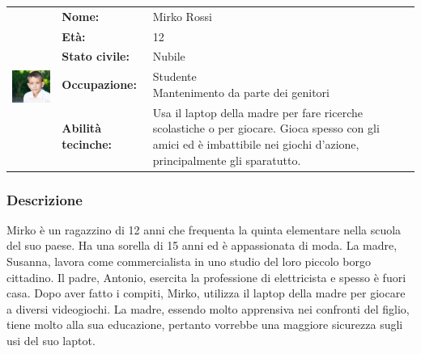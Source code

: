 \documentclass[../Report.tex]{subfiles}
\begin{document}
    \vspace{1.5cm}

    \begin{table}[H]
        \begin{tabular}{|c|l|p{7cm}|}
            \hline
            \multirow{5}{*}{\includegraphics[width=5cm, height=5cm]{Mirko.jpg}} 
                & \textbf{Nome:} & Mirko Rossi\\ \cmidrule{2-3}
            & \textbf{Età:} & 12 \\ \cmidrule{2-3}
            & \textbf{Stato civile:} & Nubile \\ \cmidrule{2-3}
            & \textbf{Occupazione:} & \makecell{Studente \\ Mantenimento da parte dei genitori} \\ \cmidrule{2-3}
            & \textbf{Abilità tecinche:} & Usa il laptop della madre per fare ricerche scolastiche o per giocare. Gioca spesso con gli amici ed è imbattibile nei giochi d'azione, principalmente gli sparatutto. \\
            \hline
        \end{tabular}
    \end{table}

    \subsubsection{Descrizione}
    Mirko è un ragazzino di 12 anni che frequenta la quinta elementare nella scuola del suo paese. Ha una sorella di 15 anni ed è appassionata di moda. La madre, Susanna, lavora come commercialista in uno studio del loro piccolo borgo cittadino. Il padre, Antonio, esercita la professione di elettricista e spesso è fuori casa. Dopo aver fatto i compiti, Mirko, utilizza il laptop della madre per giocare a diversi videogiochi. La madre, essendo molto apprensiva nei confronti del figlio, tiene molto alla sua educazione, pertanto vorrebbe una maggiore sicurezza sugli usi del suo laptot.

    \vspace{1.5cm}
\end{document}
